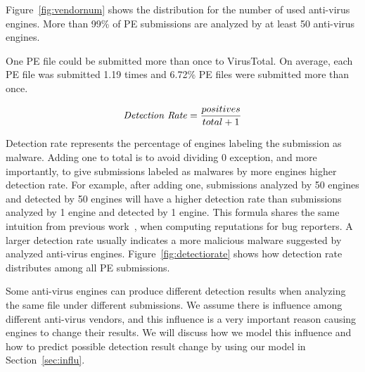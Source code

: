 



Figure~\ref{fig:vendornum} shows the distribution for the number of used anti-virus engines. 
More than 99\% of PE submissions are analyzed by at least 50 anti-virus engines. 

One PE file could be submitted more than once to VirusTotal. 
On average, each PE file was submitted 1.19 times and 6.72\% PE files were submitted more than once. 

$$ \textrm{\textit{Detection Rate}} = \dfrac{positives}{total + 1}$$

Detection rate represents the percentage of engines labeling the submission as malware. 
Adding one to total is to avoid dividing 0 exception, and more importantly, 
to give submissions labeled as malwares by more engines higher detection rate. 
For example, after adding one, submissions analyzed by 50 engines and detected by 50 engines will have a higher detection rate 
than submissions analyzed by 1 engine and detected by 1 engine. 
This formula shares the same intuition from previous work~\cite{GuoICSE2010}, when computing reputations for bug reporters. 
A larger detection rate usually indicates a more malicious malware suggested by analyzed anti-virus engines. 
Figure~\ref{fig:detectiorate} shows how detection rate distributes among all PE submissions. 

Some anti-virus engines can produce different detection results when analyzing the same file under different submissions.
We assume there is influence among different anti-virus vendors, 
and this influence is a very important reason causing engines to change their results.
We will discuss how we model this influence and how to predict possible detection result change by using our model in Section~\ref{sec:influ}.
\fi

